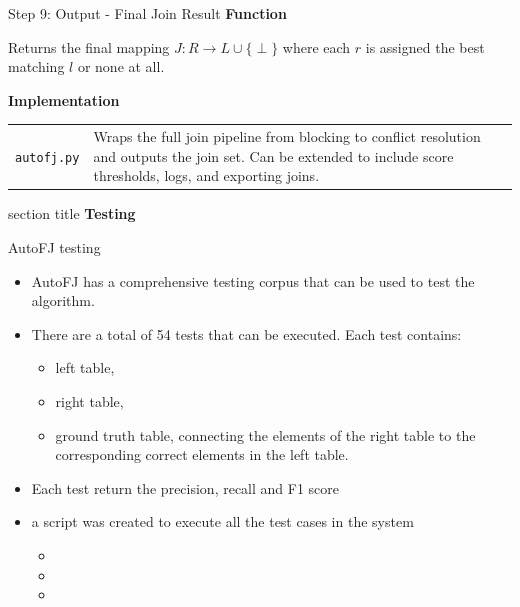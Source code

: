 \documentclass[8pt]{beamer} %
\begin{document}
\begin{frame}{Step 9: Output - Final Join Result}
	\textbf{Function}
	
	Returns the final mapping $J: R \rightarrow L \cup \{\perp\}$ where each $r$ is assigned the best matching $l$ or none at all.
	
	\vspace{2em}
	
	\textbf{Implementation}

	\begin{tabular}{l p{3in}}	
		\texttt{autofj.py} & Wraps the full join pipeline from blocking to conflict resolution and outputs the join set. Can be extended to include score thresholds, logs, and exporting joins.
	\end{tabular}


\end{frame}

\begin{frame}[plain]
	\begin{beamercolorbox}[wd=\paperwidth,ht=0.7\paperheight,dp=2ex,center]{section title}
		\Huge \textbf{Testing}
	\end{beamercolorbox}
\end{frame}

\begin{frame}{AutoFJ testing}
	\begin{itemize}
		\item AutoFJ has a comprehensive testing corpus that can be used to test the algorithm.
		\item There are a total of 54 tests that can be executed. Each test contains:
		\begin{itemize}
			\item left table,
			\item right table,
			\item ground truth table, connecting the elements of the right table to the corresponding correct elements in the left table.
		\end{itemize}
		\item Each test return the precision, recall and F1 score
		\item a script was created to execute all the test cases in the system
		\begin{itemize}
			\item 
			\item 
			\item 
		\end{itemize}
	\end{itemize}

\end{frame}
\end{document}
